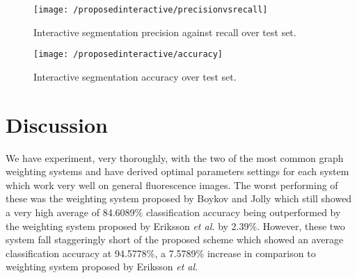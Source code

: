 \begin{figure}[!h]
	\centering
	\texttt{[image: /proposedinteractive/precisionvsrecall]}
	\caption{Interactive segmentation precision against recall over test set.}
	\label{fig:interactiveprecisionvsrecall}
\end{figure}

\begin{figure}[!t]
	\centering
	\texttt{[image: /proposedinteractive/accuracy]}
	\caption{Interactive segmentation accuracy over test set.}
	\label{fig:interactiveaccuracy}
\end{figure}

\newpage
\section{Discussion}
\label{sec:interactivediscussion}


We have experiment, very thoroughly, with the two of the most common graph weighting systems and have derived optimal parameters settings for each system which work very well on general fluorescence images. The worst performing of these was the weighting system proposed by Boykov and Jolly which still showed a very high average of 84.6089\% classification accuracy being outperformed by the weighting system proposed by Eriksson \textit{et al.} by 2.39\%. However, these two system fall staggeringly short of the proposed scheme which showed an average classification accuracy at 94.5778\%, a 7.5789\% increase in comparison to weighting system proposed by Eriksson \textit{et al.}







